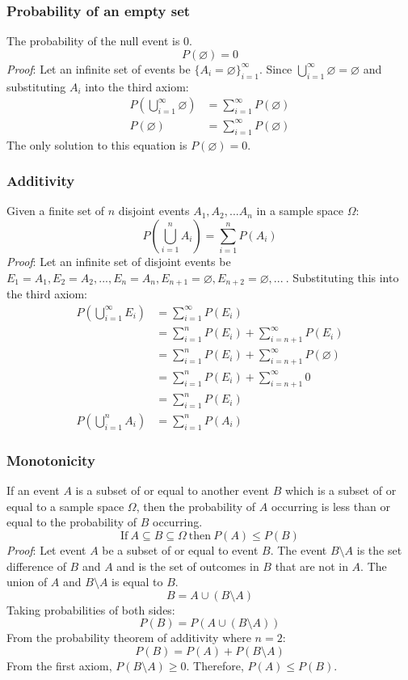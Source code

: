 \documentclass{article}
\begin{document}
\subsubsection{Probability of an empty set}

The probability of the null event is 0.
\[P(\varnothing)=0\]
\textit{Proof}: Let an infinite set of events be $\{A_i=\varnothing \}_{i=1}^\infty$. Since $\bigcup_{i=1}^\infty \varnothing = \varnothing$ and substituting $A_i$ into the third axiom:
\begin{equation*}
\begin{split}
P(\bigcup_{i=1}^\infty \varnothing) & = \sum_{i=1}^\infty P(\varnothing) \\
P(\varnothing) & = \sum_{i=1}^\infty P(\varnothing)
\end{split}
\end{equation*}
The only solution to this equation is $P(\varnothing)=0$.

\subsubsection{Additivity}

Given a finite set of $n$ disjoint events ${A_1, A_2, ... A_n}$ in a sample space $\Omega$:
\[P(\bigcup_{i=1}^n A_i) = \sum_{i=1}^n P(A_i)\]
\textit{Proof}: Let an infinite set of disjoint events be $E_1 = A_1, E_2 = A_2, ... , E_n = A_n, E_{n+1} = \varnothing, E_{n+2} = \varnothing, ... \ $. Substituting this into the third axiom:
\begin{equation*}
\begin{split}
P(\bigcup_{i=1}^\infty E_i) & = \sum_{i=1}^\infty P(E_i) \\
 & =\sum_{i=1}^n P(E_i) + \sum_{i=n+1}^\infty P(E_i) \\
 & =\sum_{i=1}^n P(E_i) + \sum_{i=n+1}^\infty P(\varnothing) \\
 & =\sum_{i=1}^n P(E_i) + \sum_{i=n+1}^\infty 0 \\
 & =\sum_{i=1}^n P(E_i) \\
P(\bigcup_{i=1}^n A_i) & = \sum_{i=1}^n P(A_i)
\end{split}
\end{equation*}

\subsubsection{Monotonicity}

If an event $A$ is a subset of or equal to another event $B$ which is a subset of or equal to a sample space $\Omega$, then the probability of $A$ occurring is less than or equal to the probability of $B$ occurring.
\[\mathrm{If} \ A \subseteq B \subseteq \Omega \ \mathrm{then} \ P(A) \leq P(B)\]
\textit{Proof}: Let event $A$ be a subset of or equal to event $B$. The event $B \setminus A$ is the set difference of $B$ and $A$ and is the set of outcomes in $B$ that are not in $A$. The union of $A$ and $B \setminus A$ is equal to $B$.
\[B=A \cup (B \setminus A)\]
Taking probabilities of both sides:
\[P(B)=P(A \cup (B \setminus A))\]
From the probability theorem of additivity where $n=2$:
\[P(B)=P(A) + P(B \setminus A)\]
From the first axiom, $P(B \setminus A) \geq 0$. Therefore, $P(A) \leq P(B)$. 
\end{document}

